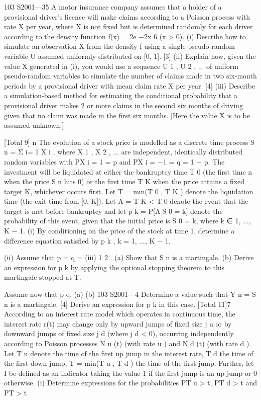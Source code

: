 103 S2001—35
A motor insurance company assumes that a holder of a provisional driver’s
licence will make claims according to a Poisson process with rate X per year,
where X is not fixed but is determined randomly for each driver according to the
density function
f(x) = 2e −2x
6
(x > 0).
(i) Describe how to simulate an observation X from the density f using a
single pseudo-random variable U assumed uniformly distributed on [0, 1].
[3]
(ii) Explain how, given the value X generated in (i), you would use a sequence
U 1 , U 2 , ... of uniform pseudo-random variables to simulate the number of
claims made in two six-month periods by a provisional driver with mean
claim rate X per year.
[4]
(iii) Describe a simulation-based method for estimating the conditional
probability that a provisional driver makes 2 or more claims in the second
six months of driving given that no claim was made in the first six
months. [Here the value X is to be assumed unknown.]

[Total 9]
n
The evolution of a stock price is modelled as a discrete time process S n = Σ i=
1 X i ,
where X 1 , X 2 , ... are independent, identically distributed random variables with
P{X i = 1} = p and P{X i = −1} = q = 1 − p. The investment will be liquidated at
either the bankruptcy time T 0 (the first time n when the price S n hits 0) or the
first time T K when the price attains a fixed target K, whichever occurs first.
Let T = min(T 0 , T K ) denote the liquidation time (the exit time from [0, K]). Let
A = {T K < T 0 } denote the event that the target is met before bankruptcy and let
p k = P[AS 0 = k] denote the probability of this event, given that the initial price is
S 0 = k, where k ∈ {1, ..., K − 1}.
(i) By conditioning on the price of the stock at time 1, determine a difference
equation satisfied by p k , k = 1, ..., K − 1.

(ii) Assume that p = q =
(iii)
1
2
.
(a) Show that S n is a martingale.
(b) Derive an expression for p k by applying the optional stopping
theorem to this martingale stopped at T.

Assume now that p \neq q.
(a)
(b)
103 S2001—4
Determine a value \theta {} such that Y n = \theta S n is a martingale.
[4]
Derive an expression for p k in this case.
[Total 11]7
According to an interest rate model which operates in continuous time, the
interest rate r(t) may change only by upward jumps of fixed size j u or by
downward jumps of fixed size j d (where j d < 0), occurring independently according
to Poisson processes N u (t) (with rate \lambda u ) and N d (t) (with rate \lambda d ).
Let T u denote the time of the first up jump in the interest rate, T d the time of the
first down jump, T = min(T u , T d ) the time of the first jump. Further, let I be
defined as an indicator taking the value 1 if the first jump is an up jump or 0
otherwise.
(i) Determine expressions for the probabilities P{T u > t}, P{T d > t} and P{T > t}

